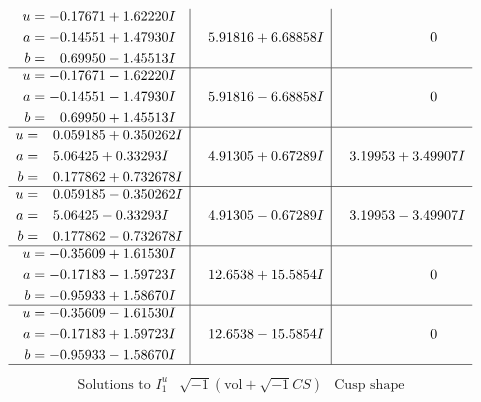 \documentclass[1p]{elsarticle_modified}
\theoremstyle{definition}
\newcommand{\I}{\sqrt{-1}}
\begin{document}
$$\begin{array}{c|c|c}
\begin{aligned}
u &= -0.17671 + 1.62220 I \\
a &= -0.14551 + 1.47930 I \\
b &= \phantom{-}0.69950 - 1.45513 I\end{aligned}
 & \phantom{-}5.91816 + 6.68858 I & \phantom{-0.000000 } 0 \\ \hline\begin{aligned}
u &= -0.17671 - 1.62220 I \\
a &= -0.14551 - 1.47930 I \\
b &= \phantom{-}0.69950 + 1.45513 I\end{aligned}
 & \phantom{-}5.91816 - 6.68858 I & \phantom{-0.000000 } 0 \\ \hline\begin{aligned}
u &= \phantom{-}0.059185 + 0.350262 I \\
a &= \phantom{-}5.06425 + 0.33293 I \\
b &= \phantom{-}0.177862 + 0.732678 I\end{aligned}
 & \phantom{-}4.91305 + 0.67289 I & \phantom{-}3.19953 + 3.49907 I \\ \hline\begin{aligned}
u &= \phantom{-}0.059185 - 0.350262 I \\
a &= \phantom{-}5.06425 - 0.33293 I \\
b &= \phantom{-}0.177862 - 0.732678 I\end{aligned}
 & \phantom{-}4.91305 - 0.67289 I & \phantom{-}3.19953 - 3.49907 I \\ \hline\begin{aligned}
u &= -0.35609 + 1.61530 I \\
a &= -0.17183 - 1.59723 I \\
b &= -0.95933 + 1.58670 I\end{aligned}
 & \phantom{-}12.6538 + 15.5854 I & \phantom{-0.000000 } 0 \\ \hline\begin{aligned}
u &= -0.35609 - 1.61530 I \\
a &= -0.17183 + 1.59723 I \\
b &= -0.95933 - 1.58670 I\end{aligned}
 & \phantom{-}12.6538 - 15.5854 I & \phantom{-0.000000 } 0\\
 \hline 
 \end{array}$$\newpage$$\begin{array}{c|c|c}  
\text{Solutions to }I^u_{1}& \I (\text{vol} + \sqrt{-1}CS) & \text{Cusp shape}\\
 \hline 
\begin{aligned}

\end{aligned}
\end{array}$$
\end{document}
